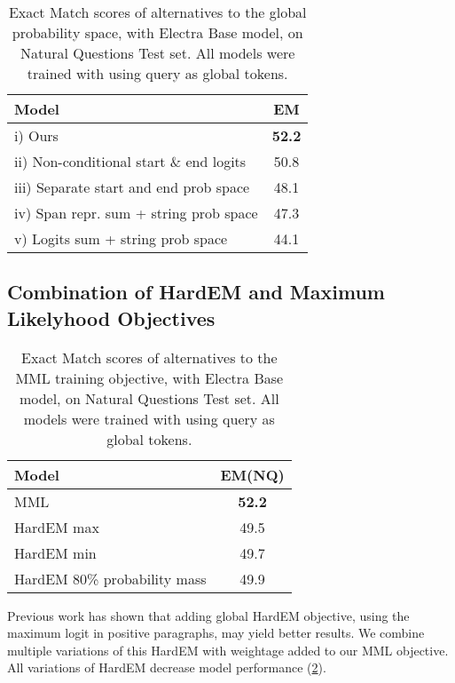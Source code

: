 \documentclass[11pt]{article}
\begin{document}
\begin{table}[h!]
\begin{center}
\begin{tabular}{lc}
\toprule
\textbf{Model} & \textbf{EM}\\ 
\toprule 
i) \hspace{2pt} Ours & \textbf{52.2} \\
ii) Non-conditional start \& end logits & 50.8 \\
iii) Separate start and end prob space & 48.1 \\
iv) Span repr. sum + string prob space  & 47.3 \\
v) \hspace{1pt} Logits sum + string prob space & 44.1 \\
\bottomrule
\end{tabular}
\end{center}
\caption{Exact Match scores of alternatives to the global probability space, with Electra Base model, on Natural Questions Test set. All models were trained with using query as global tokens.}
\label{tab_alternatives_prob}
\end{table}
 
\subsection{Combination of HardEM and Maximum Likelyhood Objectives}

\begin{table}[h!]
\begin{center}
\begin{tabular}{lc}
\toprule
\textbf{Model} & \textbf{EM(NQ)}\\ 
\toprule 
MML & \textbf{52.2} \\
HardEM max & 49.5 \\
HardEM min & 49.7 \\
HardEM 80\% probability mass & 49.9 \\
\bottomrule
\end{tabular}
\end{center}
\caption{Exact Match scores of alternatives to the MML training objective, with Electra Base model, on Natural Questions Test set. All models were trained with using query as global tokens.}
\label{tab_alternatives_obj}
\end{table}

Previous work \cite{prob-assum, cheng-etal-2021-unitedqa} has shown that adding global HardEM objective, using the maximum logit in positive paragraphs, may yield better results. We combine multiple variations of this HardEM with  weightage added to our MML objective. All variations of HardEM decrease model performance (\cref{tab_alternatives_obj}). 
\end{document}
